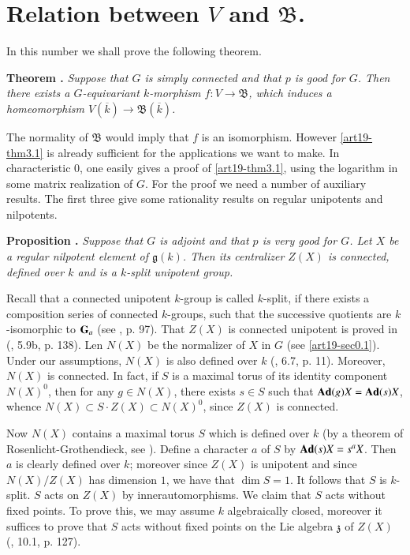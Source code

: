 \section{Relation between \texorpdfstring{$V$}{V} and \texorpdfstring{$\mathfrak{B}$}{B}.}\label{art19-sec3}

In this number we shall prove the following theorem.

\medskip
\noindent
{\bf Theorem .\label{art19-thm3.1}}
{\em Suppose that $G$ is simply connected and that $p$ is good for $G$. Then there exists a $G$-equivariant $k$-morphism $f:V\to \mathfrak{B}$, which induces a homeomorphism $V(\overline{k})\to \mathfrak{B}(\overline{k})$.}
\smallskip

The normality of $\mathfrak{B}$ would imply that $f$ is an isomorphism. However \ref{art19-thm3.1} is already sufficient for the applications we want to make. In characteristic $0$, one easily gives a proof of \ref{art19-thm3.1}, using the logarithm in some matrix realization of $G$. For the proof we need a number of auxiliary results. The first three give some rationality results on regular unipotents and nilpotents.

\medskip
\noindent
{\bf Proposition .\label{art19-prop3.2}}
{\em Suppose that $G$ is adjoint and that $p$ is very good for $G$. Let $X$ be a regular nilpotent element of $\mathfrak{g}(k)$. Then its centralizer $Z(X)$ is connected, defined over $k$ and is a $k$-split unipotent group.}
\smallskip

Recall that a connected unipotent $k$-group is called $k$-split, if there exists a composition series of connected $k$-groups, such that the successive quotients are $k$-isomorphic to $\mathbf{G}_{a}$ (see \cite{art19-key11}, p. 97). That $Z(X)$ is connected unipotent is proved in (\cite{art19-key14}, 5.9b, p. 138). Len $N(X)$ be the normalizer of $X$ in $G$ (see \ref{art19-sec0.1}). Under our assumptions, $N(X)$ is also defined over $k$ (\cite{art19-key10}, 6.7, p. 11). Moreover, $N(X)$ is connected. In fact, if $S$ is a maximal torus of its identity component $N(X)^{0}$, then for any $g\in N(X)$, there exists $s\in S$ such that $\mathbf{Ad}(g)X=\mathbf{Ad}(s)X$, whence $N(X)\subset S\cdot Z(X)\subset N(X)^{0}$, since $Z(X)$ is connected.

Now $N(X)$ contains a maximal torus $S$ which is defined over $k$ (by a theorem of Rosenlicht-Grothendieck, see \cite{art19-key1}). Define a character $a$ of $S$ by $\mathbf{Ad}(s)X=s^{a}X$. Then $a$ is clearly defined over $k$; moreover since $Z(X)$ is unipotent and since $N(X)/Z(X)$ has dimension $1$, we have that $\dim S=1$. It follows that $S$ is $k$-split. $S$ acts on $Z(X)$ by inner\pageoriginale automorphisms. We claim that $S$ acts without fixed points. To prove this, we may assume $k$ algebraically closed, moreover it suffices to prove that $S$ acts without fixed points on the Lie algebra $\mathfrak{z}$ of $Z(X)$ (\cite{art19-key3}, 10.1, p. 127).

